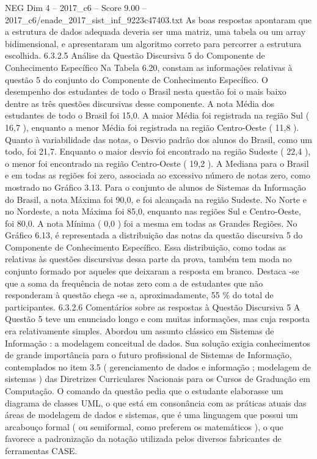 \begin{textsample}{NEG Dim 4 – 2017\_c6 – Score 9.00 – 2017\_c6/enade\_2017\_sist\_inf\_9223c47403.txt}
As boas respostas apontaram que a estrutura de dados adequada deveria ser uma matriz, uma tabela ou um array bidimensional, e apresentaram um algoritmo correto para percorrer a estrutura escolhida. 6.3.2.5 Análise da Questão Discursiva 5 do Componente de Conhecimento Específico Na Tabela 6.20, constam as informações relativas à questão 5 do conjunto do Componente de Conhecimento Específico.
O desempenho dos estudantes de todo o Brasil nesta questão foi o mais baixo dentre as três questões discursivas desse componente.
A nota Média dos estudantes de todo o Brasil foi 15,0.
A maior Média foi registrada na região Sul ( 16,7 ), enquanto a menor Média foi registrada na região Centro-Oeste ( 11,8 ).
Quanto à variabilidade das notas, o Desvio padrão dos alunos do Brasil, como um todo, foi 21,7.
Enquanto o maior desvio foi encontrado na região Sudeste ( 22,4 ), o menor foi encontrado na região Centro-Oeste ( 19,2 ).
A Mediana para o Brasil e em todas as regiões foi zero, associada ao excessivo número de notas zero, como mostrado no Gráfico 3.13.
Para o conjunto de alunos de Sistemas da Informação do Brasil, a nota Máxima foi 90,0, e foi alcançada na região Sudeste.
No Norte e no Nordeste, a nota Máxima foi 85,0, enquanto nas regiões Sul e Centro-Oeste, foi 80,0.
A nota Mínima ( 0,0 ) foi a mesma em todas as Grandes Regiões.
No Gráfico 6.13, é representada a distribuição das notas da questão discursiva 5 do Componente de Conhecimento Específico.
Essa distribuição, como todas as relativas às questões discursivas dessa parte da prova, também tem moda no conjunto formado por aqueles que deixaram a resposta em branco.
Destaca -se que a soma da frequência de notas zero com a de estudantes que não responderam à questão chega -se a, aproximadamente, 55 \% do total de participantes. 6.3.2.6 Comentários sobre as respostas à Questão Discursiva 5 A Questão 5 teve um enunciado longo e com muitas informações, mas cuja resposta era relativamente simples.
Abordou um assunto clássico em Sistemas de Informação : a modelagem conceitual de dados.
Sua solução exigia conhecimentos de grande importância para o futuro profissional de Sistemas de Informação, contemplados no item 3.5 ( gerenciamento de dados e informação ; modelagem de sistemas ) das Diretrizes Curriculares Nacionais para os Cursos de Graduação em Computação.
O comando da questão pedia que o estudante elaborasse um diagrama de classes UML, o que está em consonância com as práticas atuais das áreas de modelagem de dados e sistemas, que é uma linguagem que possui um arcabouço formal ( ou semiformal, como preferem os matemáticos ), o que favorece a padronização da notação utilizada pelos diversos fabricantes de ferramentas CASE.

\end{textsample}
